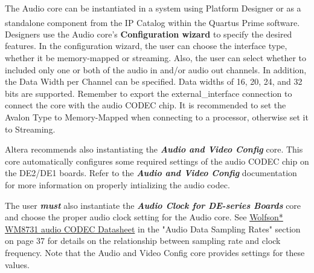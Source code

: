 \documentclass[11pt, twoside, pdftex]{article}
\begin{document}
The Audio core can be instantiated in a system using Platform Designer or as a standalone 
component from the IP Catalog within the Quartus\textsuperscript{\textregistered} Prime software. 
Designers use the Audio core's \textbf{Configuration wizard} to specify the 
desired features. In the configuration wizard, the 
user can choose the interface type, whether it be memory-mapped or streaming. 
Also, the user can select whether to included only one or both of the audio in 
and/or audio out channels.
In addition, the \textsf{Data Width per Channel} 
can be specified. Data widths of 16, 20, 24, and 32 bits are supported. 
Remember to export the external\_interface connection to connect the core 
with the audio CODEC chip. It is recommended to set the \textsf{Avalon Type} to 
Memory-Mapped when connecting to a processor, otherwise set it to Streaming. 

{\leftpointright}
Altera recommends also instantiating the \textbf{\emph{Audio and Video Config}} 
core. This core automatically configures some required settings of the audio CODEC 
chip on the DE2/DE1 boards.
Refer to the \textbf{\emph{Audio and Video Config}} documentation for more 
information on properly intializing the audio codec.

{\leftpointright}
The user \textbf{\emph{must}} also instantiate the \textbf{{\em Audio Clock 
for DE-series Boards}} core and choose the proper audio clock 
setting for the Audio core. See \href{WM8731_WM8731L.pdf}{Wolfson* WM8731 audio 
CODEC Datasheet} in the "Audio Data Sampling Rates" section on page 37 for 
details on the relationship between sampling rate and clock frequency.
Note that the Audio and Video Config core provides settings for these values.
\end{document}
